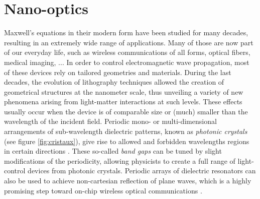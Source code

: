 \section{Nano-optics}

Maxwell's equations in their modern form have been studied for many decades, resulting in an extremely wide range of applications. Many of those are now part of our everyday life, such as wireless communications of all forms, optical fibers, medical imaging, ... In order to control electromagnetic wave propagation, most of these devices rely on tailored geometries and materials. During the last decades, the evolution of lithography techniques allowed the creation of geometrical structures at the nanometer scale, thus unveiling a variety of new phenomena arising from light-matter interactions at such levels. These effects usually occur when the device is of comparable size or (much) smaller than the wavelength of the incident field. Periodic mono- or multi-dimensional arrangements of sub-wavelength dielectric patterns, known as \emph{photonic crystals} (see figure \ref{fig:cristaux}), give rise to allowed and forbidden wavelengths regions in certain directions \cite{Johnson1}. These so-called \emph{band gaps} can be tuned by slight modifications of the periodicity, allowing physicists to create a full range of light-control devices from photonic crystals. Periodic arrays of dielectric resonators can also be used to achieve non-cartesian reflection of plane waves, which is a highly promising step toward on-chip wireless optical communications \cite{Zou1}.

 

